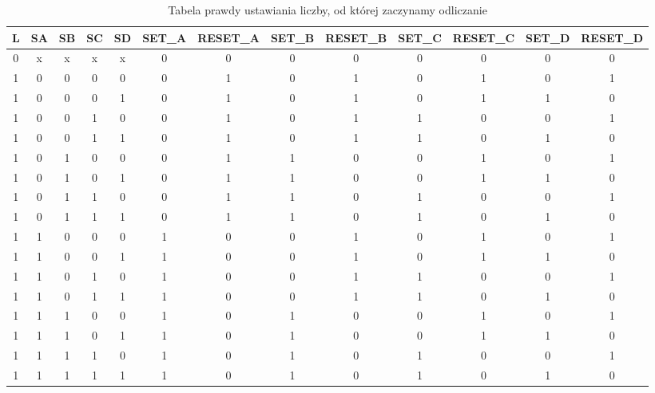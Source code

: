 \documentclass{article}
\begin{document}
    \pagebreak
    \begin{table}[H]
        \centering
        \captionsetup{font=small, skip=2pt}
        \caption{Tabela prawdy ustawiania liczby, od której zaczynamy odliczanie}
        \begin{tabular}{|c||c|c|c|c||c|c|c|c|c|c|c|c|}
            \hline
            L & SA & SB & SC & SD & SET\_A & RESET\_A & SET\_B & RESET\_B & SET\_C & RESET\_C & SET\_D & RESET\_D \\
            \hline
            0 & x & x & x & x & 0 & 0 & 0 & 0 & 0 & 0 & 0 & 0\\
            1 & 0 & 0 & 0 & 0 & 0 & 1 & 0 & 1 & 0 & 1 & 0 & 1\\
            1 & 0 & 0 & 0 & 1 & 0 & 1 & 0 & 1 & 0 & 1 & 1 & 0\\
            1 & 0 & 0 & 1 & 0 & 0 & 1 & 0 & 1 & 1 & 0 & 0 & 1\\
            1 & 0 & 0 & 1 & 1 & 0 & 1 & 0 & 1 & 1 & 0 & 1 & 0\\
            1 & 0 & 1 & 0 & 0 & 0 & 1 & 1 & 0 & 0 & 1 & 0 & 1\\
            1 & 0 & 1 & 0 & 1 & 0 & 1 & 1 & 0 & 0 & 1 & 1 & 0\\
            1 & 0 & 1 & 1 & 0 & 0 & 1 & 1 & 0 & 1 & 0 & 0 & 1\\
            1 & 0 & 1 & 1 & 1 & 0 & 1 & 1 & 0 & 1 & 0 & 1 & 0\\
            1 & 1 & 0 & 0 & 0 & 1 & 0 & 0 & 1 & 0 & 1 & 0 & 1\\
            1 & 1 & 0 & 0 & 1 & 1 & 0 & 0 & 1 & 0 & 1 & 1 & 0\\
            1 & 1 & 0 & 1 & 0 & 1 & 0 & 0 & 1 & 1 & 0 & 0 & 1\\
            1 & 1 & 0 & 1 & 1 & 1 & 0 & 0 & 1 & 1 & 0 & 1 & 0\\
            1 & 1 & 1 & 0 & 0 & 1 & 0 & 1 & 0 & 0 & 1 & 0 & 1\\
            1 & 1 & 1 & 0 & 1 & 1 & 0 & 1 & 0 & 0 & 1 & 1 & 0\\
            1 & 1 & 1 & 1 & 0 & 1 & 0 & 1 & 0 & 1 & 0 & 0 & 1\\
            1 & 1 & 1 & 1 & 1 & 1 & 0 & 1 & 0 & 1 & 0 & 1 & 0\\
            \hline
            
        \end{tabular}
    \end{table}
    
\end{document}
